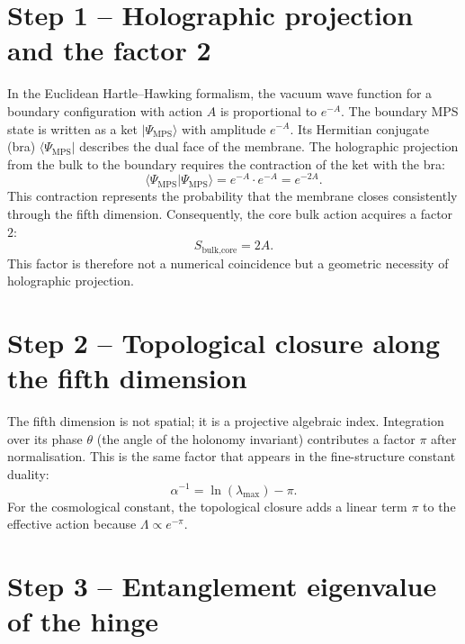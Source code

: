 \documentclass[12pt]{article}
\begin{document}
\section{Step 1 – Holographic projection and the factor 2}

In the Euclidean Hartle–Hawking formalism, the vacuum wave function for a boundary configuration with action \(A\) is proportional to \(e^{-A}\). The boundary MPS state is written as a ket \(|\Psi_{\text{MPS}}\rangle\) with amplitude \(e^{-A}\). Its Hermitian conjugate (bra) \(\langle\Psi_{\text{MPS}}|\) describes the dual face of the membrane. The holographic projection from the bulk to the boundary requires the contraction of the ket with the bra:
\begin{equation}\label{eq:contract}
\langle\Psi_{\text{MPS}}|\Psi_{\text{MPS}}\rangle = e^{-A} \cdot e^{-A} = e^{-2A}.
\end{equation}
This contraction represents the probability that the membrane closes consistently through the fifth dimension. Consequently, the core bulk action acquires a factor \(2\):
\begin{equation}\label{eq:Sbulk_core}
S_{\text{bulk,core}} = 2A.
\end{equation}
This factor is therefore not a numerical coincidence but a geometric necessity of holographic projection.

\section{Step 2 – Topological closure along the fifth dimension}

The fifth dimension is not spatial; it is a projective algebraic index. Integration over its phase \(\theta\) (the angle of the holonomy invariant) contributes a factor \(\pi\) after normalisation. This is the same factor that appears in the fine-structure constant duality:
\begin{equation}\label{eq:alpha_duality}
\alpha^{-1} = \ln(\lambda_{\max}) - \pi.
\end{equation}
For the cosmological constant, the topological closure adds a linear term \(\pi\) to the effective action because \(\Lambda \propto e^{-\pi}\).

\section{Step 3 – Entanglement eigenvalue of the hinge}
\end{document}
